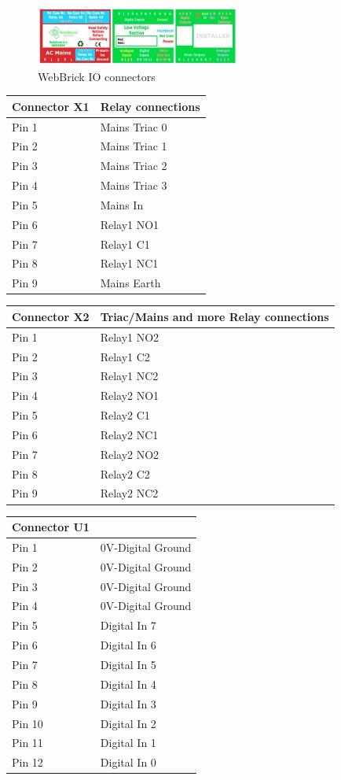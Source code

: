 \begin{figure}[H]
\centering
\includegraphics[width=0.6\textwidth]{Images/TopCover.jpg}
\caption{WebBrick IO connectors}
\end{figure}

\begin{tabular}{l|p{5cm}}
Connector X1&Relay connections\\
\hline
Pin 1&Mains Triac 0\\
Pin 2&Mains Triac 1\\
Pin 3&Mains Triac 2\\
Pin 4&Mains Triac 3\\
Pin 5&Mains In\\
Pin 6&Relay1 NO1\\
Pin 7&Relay1 C1\\
Pin 8&Relay1 NC1\\
Pin 9&Mains Earth\\
\end{tabular}

\begin{tabular}{l|p{5cm}}
Connector X2&Triac/Mains and more Relay connections\\
\hline
Pin 1&Relay1 NO2\\
Pin 2&Relay1 C2\\
Pin 3&Relay1 NC2\\
Pin 4&Relay2 NO1\\
Pin 5&Relay2 C1\\
Pin 6&Relay2 NC1\\
Pin 7&Relay2 NO2\\
Pin 8&Relay2 C2\\
Pin 9&Relay2 NC2\\
\end{tabular}

\begin{tabular}{l|p{5cm}}
Connector U1&\\
\hline
Pin 1&0V-Digital Ground\\
Pin 2&0V-Digital Ground\\
Pin 3&0V-Digital Ground\\
Pin 4&0V-Digital Ground\\
Pin 5&Digital In 7\\
Pin 6&Digital In 6\\
Pin 7&Digital In 5\\
Pin 8&Digital In 4\\
Pin 9&Digital In 3\\
Pin 10&Digital In 2\\
Pin 11&Digital In 1\\
Pin 12&Digital In 0\\
\end{tabular}

